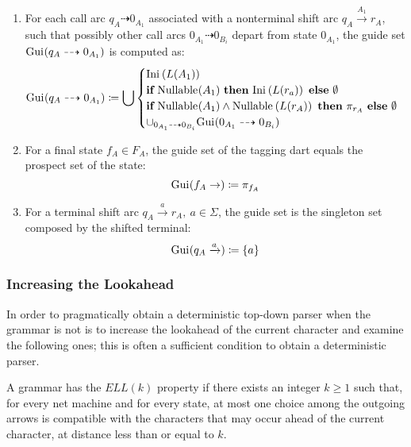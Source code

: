 \documentclass[english]{article}
\begin{document}
\begin{enumerate}
  \item For each call arc \(q_A \dashrightarrow 0_{A_1}\) associated with a nonterminal shift arc \(q_A \xrightarrow{A_1} r_A\), such that possibly other call arcs \(0_{A_1} \dashrightarrow 0_{B_i}\) depart from state \(0_{A_1}\), the guide set \(\text{Gui}\hspace{0.1ex}(q_A \dashrightarrow 0_{A_1})\) is computed as:
        \[ \text{Gui}\hspace{0.1ex}(q_A \dashrightarrow 0_{A_1}) \coloneqq \bigcup \begin{cases}
            \text{Ini}\hspace{0.1ex}\left( L(A_1) \right)                                                                                                 \\
            \textbf{if} \ \text{Nullable}\hspace{0.1ex}(A_1) \ \textbf{then} \ \text{Ini}\hspace{0.1ex}\left( L(r_a) \right) \ \textbf{else} \ \emptyset                      \\
            \textbf{if} \ \text{Nullable}\hspace{0.1ex}(A_1) \land \text{Nullable}\hspace{0.1ex}\left( L(r_A) \right) \ \textbf{then} \ \pi_{r_A} \ \textbf{else} \ \emptyset \\
            \cup_{0_{A_1} \dashrightarrow 0_{B_i}} \text{Gui}\hspace{0.1ex}(0_{A_1} \dashrightarrow 0_{B_i})
          \end{cases}\]
  \item For a final state \(f_A \in F_A\), the guide set of the tagging dart equals the prospect set of the state:
        \[ \text{Gui}\hspace{0.1ex}(f_A \rightarrow) \coloneqq \pi_{f_A} \]
  \item For a terminal shift arc \(q_A \xrightarrow{a} r_A, \ a \in \Sigma\), the guide set is the singleton set composed by the shifted terminal:
        \[ \text{Gui}\hspace{0.1ex}(q_A \xrightarrow{a}) \coloneqq \left\{ a \right\} \]
\end{enumerate}

\subsubsection{Increasing the Lookahead}

In order to pragmatically obtain a deterministic top-down parser when the grammar is not \ello is to increase the lookahead of the current character and examine the following ones;
this is often a sufficient condition to obtain a deterministic parser.

A grammar has the \(\textit{ELL}(k)\) property if there exists an integer \(k \geq 1\) such that, for every net machine and for every state, at most one choice among the outgoing arrows is compatible with the characters that may occur ahead of the current character, at distance less than or equal to \(k\).
\end{document}
